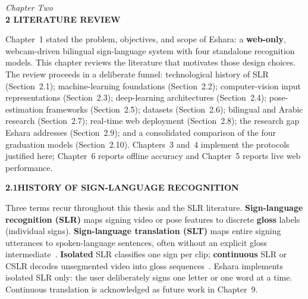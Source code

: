 \newpage
\thispagestyle{plain}

\begin{center}
    \vspace*{0.5cm}
    {\large \textit{Chapter Two}} \\[0.4cm]
    {\Large \textbf{2 \quad LITERATURE REVIEW}}
\end{center}
\vspace{0.45in}

\normalsize
{}

\noindent Chapter~1 stated the problem, objectives, and scope of Eshara: a \textbf{web-only}, webcam-driven bilingual sign-language system with four standalone recognition models. This chapter reviews the literature that motivates those design choices. The review proceeds in a deliberate funnel: technological history of SLR (Section~2.1); machine-learning foundations (Section~2.2); computer-vision input representations (Section~2.3); deep-learning architectures (Section~2.4); pose-estimation frameworks (Section~2.5); datasets (Section~2.6); bilingual and Arabic research (Section~2.7); real-time web deployment (Section~2.8); the research gap Eshara addresses (Section~2.9); and a consolidated comparison of the four graduation models (Section~2.10). Chapters~3 and~4 implement the protocols justified here; Chapter~6 reports offline accuracy and Chapter~5 reports live web performance.\par\vspace{0.3cm}

\noindent\textbf{2.1\quad HISTORY OF SIGN-LANGUAGE RECOGNITION}\par
{}
\vspace{0.2cm}

\noindent Three terms recur throughout this thesis and the SLR literature. \textbf{Sign-language recognition (SLR)} maps signing video or pose features to discrete \textbf{gloss} labels (individual signs). \textbf{Sign-language translation (SLT)} maps entire signing utterances to spoken-language sentences, often without an explicit gloss intermediate~\cite{camgoz2018neural}. \textbf{Isolated} SLR classifies one sign per clip; \textbf{continuous} SLR or CSLR decodes unsegmented video into gloss sequences~\cite{koller2020weakly,duarte2021how2sign}. Eshara implements isolated SLR only: the user deliberately signs one letter or one word at a time. Continuous translation is acknowledged as future work in Chapter~9.\par\vspace{0.2cm}

